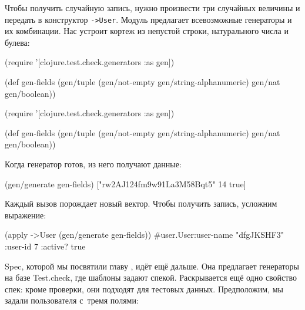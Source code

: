 \fi

Чтобы получить случайную запись, нужно произвести три случайных величины и
передать в конструктор \verb|->User|. Модуль предлагает всевозможные генераторы
и их комбинации. Нас устроит кортеж из непустой строки, натурального числа и
булева:

\ifx\devicetype\mobile

\begin{english}
  \begin{clojure}
(require
 '[clojure.test.check.generators
   :as gen])

(def gen-fields
  (gen/tuple
    (gen/not-empty
      gen/string-alphanumeric)
    gen/nat
    gen/boolean))
  \end{clojure}
\end{english}

\else

\begin{english}
  \begin{clojure}
(require '[clojure.test.check.generators :as gen])

(def gen-fields
  (gen/tuple (gen/not-empty gen/string-alphanumeric)
             gen/nat
             gen/boolean))
  \end{clojure}
\end{english}

\fi

Когда генератор готов, из него получают данные:

\begin{english}
  \begin{clojure}
(gen/generate gen-fields)
["rw2AJ124fm9w91La3M58Bqt5" 14 true]
  \end{clojure}
\end{english}

\noindent
Каждый вызов порождает новый вектор. Чтобы получить запись, усложним выражение:

\begin{english}
  \begin{clojure}
(apply ->User (gen/generate gen-fields))
#user.User{:user-name "dfgJKSHF3"
           :user-id 7
           :active? true}
  \end{clojure}
\end{english}

Spec, которой мы посвятили главу , идёт ещё дальше. Она
предлагает генераторы на базе Test.check, где шаблоны задают
спекой. Раскрывается ещё одно свойство спек: кроме проверки, они подходят для
тестовых данных. Предположим, мы задали пользователя с~тремя полями:

